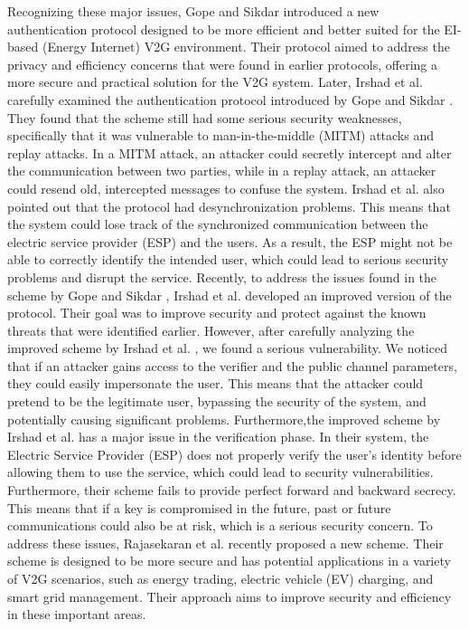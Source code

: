 \documentclass[3p,times,onecolumn]{elsarticle}
\begin{document}
Recognizing these major issues, Gope and Sikdar \cite{GT11} introduced a new authentication protocol designed to be more efficient and better suited for the EI-based (Energy Internet) V2G environment. Their protocol aimed to address the privacy and efficiency concerns that were found in earlier protocols, offering a more secure and practical solution for the V2G system.
Later, Irshad et al. \cite{GT14} carefully examined the authentication protocol introduced by Gope and Sikdar \cite{GT11}. They found that the scheme still had some serious security weaknesses, specifically that it was vulnerable to man-in-the-middle (MITM) attacks and replay attacks. In a MITM attack, an attacker could secretly intercept and alter the communication between two parties, while in a replay attack, an attacker could resend old, intercepted messages to confuse the system.
Irshad et al. also pointed out that the protocol had desynchronization problems. This means that the system could lose track of the synchronized communication between the electric service provider (ESP) and the users. As a result, the ESP might not be able to correctly identify the intended user, which could lead to serious security problems and disrupt the service.
Recently, to address the issues found in the scheme by Gope and Sikdar \cite{GT11}, Irshad et al.\cite{GT14}  developed an improved version of the protocol. Their goal was to improve security and protect against the known threats that were identified earlier.
However, after carefully analyzing the improved scheme by Irshad et al. \cite{GT14}, we found a serious vulnerability. We noticed that if an attacker gains access to the verifier and the public channel parameters, they could easily impersonate the user. This means that the attacker could pretend to be the legitimate user, bypassing the security of the system, and potentially causing significant problems.
Furthermore,the improved scheme by Irshad et al. \cite{GT14} has a major issue in the verification phase. In their system, the Electric Service Provider (ESP) does not properly verify the user's identity before allowing them to use the service, which could lead to security vulnerabilities. Furthermore, their scheme fails to provide perfect forward and backward secrecy. This means that if a key is compromised in the future, past or future communications could also be at risk, which is a serious security concern.
To address these issues, Rajasekaran et al. \cite{GT15} recently proposed a new scheme. Their scheme is designed to be more secure and has potential applications in a variety of V2G scenarios, such as energy trading, electric vehicle (EV) charging, and smart grid management. Their approach aims to improve security and efficiency in these important areas.
\end{document}
